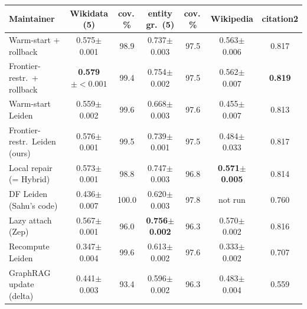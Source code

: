\begin{tabular}{l c c c c c c}
\toprule
Maintainer & Wikidata (5) & cov.\,\% & entity gr.\ (5) & cov.\,\% & Wikipedia & citation2\\
\midrule
Warm-start + rollback & 0.575$\pm$0.001 & 98.9 & 0.737$\pm$0.003 & 97.5 & 0.563$\pm$0.006 & 0.817 \\
Frontier-restr.\ + rollback & \textbf{0.579$\pm{<}0.001$} & 99.4 & 0.754$\pm$0.002 & 97.5 & 0.562$\pm$0.007 & \textbf{0.819} \\
Warm-start Leiden & 0.559$\pm$0.002 & 99.6 & 0.668$\pm$0.003 & 97.6 & 0.455$\pm$0.007 & 0.813 \\
Frontier-restr.\ Leiden (ours) & 0.576$\pm$0.001 & 99.5 & 0.739$\pm$0.001 & 97.5 & 0.484$\pm$0.033 & 0.817 \\
Local repair (= Hybrid) & 0.573$\pm$0.001 & 98.8 & 0.747$\pm$0.003 & 96.8 & \textbf{0.571$\pm$0.005} & 0.814 \\
DF Leiden (Sahu's code) & 0.436$\pm$0.007 & 100.0 & 0.620$\pm$0.003 & 97.8 & not run & 0.760 \\
Lazy attach (Zep) & 0.567$\pm$0.001 & 96.0 & \textbf{0.756$\pm$0.002} & 96.3 & 0.570$\pm$0.002 & 0.816 \\
Recompute Leiden & 0.347$\pm$0.004 & 99.6 & 0.613$\pm$0.002 & 97.6 & 0.333$\pm$0.002 & 0.707 \\
GraphRAG update (delta) & 0.441$\pm$0.003 & 93.4 & 0.596$\pm$0.002 & 96.3 & 0.483$\pm$0.004 & 0.559 \\
\bottomrule
\end{tabular}

